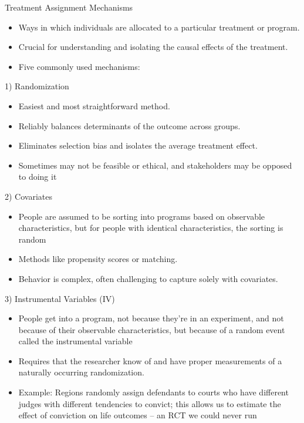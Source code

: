 \documentclass{beamer}
\begin{document}
\begin{frame}{Treatment Assignment Mechanisms}
\begin{itemize}
\item Ways in which individuals are allocated to a particular treatment or program.
\item Crucial for understanding and isolating the causal effects of the treatment.
\item Five commonly used mechanisms:
\end{itemize}
\end{frame}

\begin{frame}{1) Randomization}
\begin{itemize}
\item Easiest and most straightforward method.
\item Reliably balances determinants of the outcome across groups.
\item Eliminates selection bias and isolates the average treatment effect.
\item Sometimes may not be feasible or ethical, and stakeholders may be opposed to doing it 
\end{itemize}
\end{frame}

\begin{frame}{2) Covariates}
\begin{itemize}
\item People are assumed to be sorting into programs based on observable characteristics, but for people with identical characteristics, the sorting is random
\item Methods like propensity scores or matching.
\item Behavior is complex, often challenging to capture solely with covariates.
\end{itemize}
\end{frame}


\begin{frame}{3) Instrumental Variables (IV)}
\begin{itemize}
\item People get into a program, not because they're in an experiment, and not because of their observable characteristics, but because of a random event called the instrumental variable
\item Requires that the researcher know of and have proper measurements of a naturally occurring randomization.
\item Example: Regions randomly assign defendants to courts who have different judges with different tendencies to convict; this allows us to estimate the effect of conviction on life outcomes -- an RCT we could never run
\end{itemize}
\end{frame}
\end{document}
